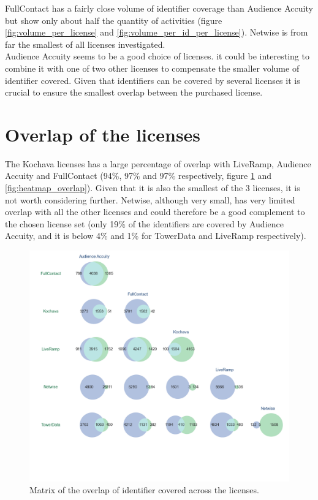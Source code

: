 \documentclass[11pt]{article} %
\begin{document}
FullContact has a fairly close volume of identifier coverage than Audience Accuity but show only about half the quantity of activities (figure \ref{fig:volume_per_license} and \ref{fig:volume_per_id_per_license}). Netwise is from far the smallest of all licenses investigated.\\


Audience Accuity seems to be a good choice of licenses. it could be interesting to combine it with one of two other licenses to compensate the smaller volume of identifier covered. Given that identifiers can be covered by several licenses it is crucial to ensure the smallest overlap between the purchased license.\\

\clearpage
\newpage
\section{Overlap of the licenses}
The Kochava licenses has a large percentage of overlap with LiveRamp, Audience Accuity and FullContact (94\%, 97\% and 97\% respectively, figure \ref{fig:venn_matrix} and \ref{fig:heatmap_overlap}). Given that it is also the smallest of the 3 licenses, it is not worth considering further. Netwise, although very small, has very limited overlap with all the other licenses and could therefore be a good complement to the chosen license set (only 19\% of the identifiers are covered by Audience Accuity, and it is below 4\% and 1\% for TowerData and LiveRamp respectively).
\begin{figure}[h!]
  \includegraphics[width=1.1\linewidth]{../outputs/venn_matrix.png}
  \caption{Matrix of the overlap of identifier covered across the licenses.}
  \label{fig:venn_matrix}
\end{figure}
\end{document}

